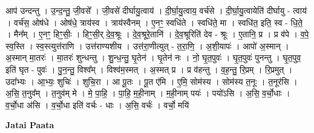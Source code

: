 \documentclass[17pt]{extarticle}
\begin{document}
आप॑ उन्दन्तु । उ॒न्द॒न्तु॒ जी॒वसे᳚ । जी॒वसे॑ दीर्घायु॒त्वाय॑ । दी॒र्घा॒यु॒त्वाय॒ वर्च॑से । दी॒र्घा॒यु॒त्वायेति॑ दीर्घायु - त्वाय॑ । वर्च॑स॒ ओष॑धे । ओष॑धे॒ त्राय॑स्व । त्राय॑स्वैनम् । ए॒नꣳ॒॒ स्वधि॑ते । स्वधि॑ते॒ मा । स्वधि॑त॒ इति॒ स्व - धि॒ते॒ । मैन᳚म् । ए॒नꣳ॒॒ हिꣳ॒॒सीः॒ । हिꣳ॒॒सी॒र् दे॒व॒श्रूः । दे॒व॒श्रूरे॒तानि॑ । दे॒व॒श्रूरिति॑ देव - श्रूः । ए॒तानि॒ प्र । प्र व॑पे । व॒पे॒ स्व॒स्ति । स्व॒स्त्युत्त॑राणि । उत्त॑राण्यशीय । उत्त॑रा॒णीत्युत् - त॒रा॒णि॒ । अ॒शी॒यापः॑ । आपो॑ अ॒स्मान् । अ॒स्मान् मा॒तरः॑ । मा॒तरः॑ शुन्धन्तु । शु॒न्ध॒न्तु॒ घृ॒तेन॑ । घृ॒तेन॑ नः । नो॒ घृ॒त॒पुवः॑ । घृ॒त॒पुवः॑ पुनन्तु । घृ॒त॒पुव॒ इति॑ घृत - पुवः॑ । पु॒न॒न्तु॒ विश्व᳚म् । विश्व॑म॒स्मत् । अ॒स्मत् प्र । प्र व॑हन्तु । व॒ह॒न्तु॒ रि॒प्रम् । रि॒प्रमुत् । उदा᳚भ्यः । आ॒भ्यः॒ शुचिः॑ । शुचि॒रा । आ पू॒तः । पू॒त ए॑मि । ए॒मि॒ सोम॑स्य । सोम॑स्य त॒नूः । त॒नूर॑सि । अ॒सि॒ त॒नुव᳚म् । त॒नुव॑म् मे । मे॒ पा॒हि॒ । पा॒हि॒ म॒ही॒नाम् । म॒ही॒नाम् पयः॑ । पयो॑ऽसि । अ॒सि॒ व॒र्चो॒धाः । व॒र्चो॒धा अ॑सि । व॒र्चो॒धा इति॑ वर्चः - धाः । अ॒सि॒ वर्चः॑ । वर्चो॒ मयि॑ \newline

\textbf{Jatai Paata} \newline
\end{document}

